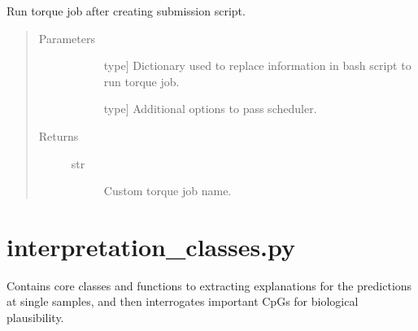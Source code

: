 \documentclass[letterpaper,10pt,english]{sphinxmanual}
\begin{document}

\begin{fulllineitems}
\label{\detokenize{index:methylnet.torque_jobs.run_torque_job_}}
Run torque job after creating submission script.
\begin{quote}\begin{description}
\item[{Parameters}] \leavevmode\begin{description}
\item[{}] \leavevmode{[}type{]}
Dictionary used to replace information in bash script to run torque job.

\item[{}] \leavevmode{[}type{]}
Additional options to pass scheduler.

\end{description}

\item[{Returns}] \leavevmode\begin{description}
\item[{str}] \leavevmode
Custom torque job name.

\end{description}

\end{description}\end{quote}

\end{fulllineitems}

\label{\detokenize{index:module-methylnet.interpretation_classes}}

\chapter{interpretation\_classes.py}
\label{\detokenize{index:interpretation-classes-py}}
Contains core classes and functions to extracting explanations for the predictions at single samples, and then interrogates important CpGs for biological plausibility.
\end{document}
